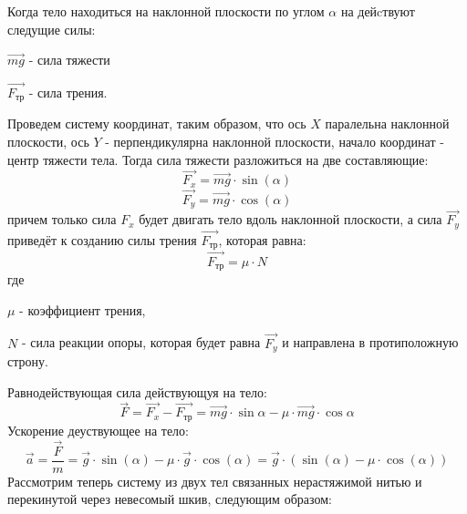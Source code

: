 \documentclass{minimal}
\begin{document}

    \noindent
    Когда тело находиться на наклонной плоскости по углом $\alpha$ на дейcтвуют следущие силы: 

    $\vec{mg}$ - сила тяжести

    $\vec{F_{\text{тр}}}$ - сила трения. 

    \noindent
    Проведем систему координат, таким образом, что ось $X$ паралельна наклонной плоскости, ось $Y$ - перпендикулярна наклонной плоскости, начало координат - центр тяжести тела. Тогда сила тяжести разложиться на две составляющие:
    \[
        \vec{F_x} = \vec{mg} \cdot \sin(\alpha)
    \]
    \[
        \vec{F_y} = \vec{mg} \cdot \cos(\alpha)
    \]
    причем только сила  $F_x$ будет двигать тело вдоль наклонной плоскости, а сила $\vec{F_y}$ приведёт к созданию силы трения $\vec{F_{\text{тр}}}$, которая равна:
    \[
        \vec{F_{\text{тр}}} = \mu \cdot N
    \]
    где

    $\mu$ - коэффициент трения, 

    $N$ - сила реакции опоры, которая будет равна $\vec{F_y}$ и направлена в протиположную строну.

    Равнодействующая сила действующуя на тело:
    \[
        \vec{F} = \vec{F_x} - \vec{F_{\text{тр}}} = \vec{mg} \cdot \sin\alpha - \mu \cdot \vec{mg} \cdot \cos\alpha
    \]
    Ускорение деуствующее на тело:
    \[
        \vec{a} = \frac{\vec{F}}{m} = \vec{g} \cdot \sin(\alpha) - \mu \cdot \vec{g} \cdot \cos(\alpha) = \vec{g} \cdot (\sin(\alpha) - \mu \cdot \cos(\alpha))
    \]
    Рассмотрим теперь систему из двух тел связанных нерастяжимой нитью и перекинутой через невесомый шкив, следующим образом:
\end{document}
